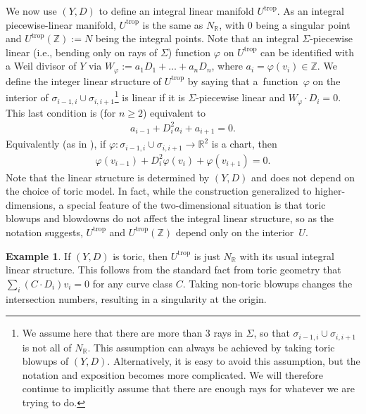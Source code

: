 \documentclass[11pt]{article}
\numberwithin{equation}{section}
\numberwithin{figure}{section}
\numberwithin{table}{section}
\DeclareMathOperator{\trop}{trop}
\let\bb=\mathbb
\let\rar=\rightarrow
\theoremstyle{definition}
\newtheorem{eg}[thm]{Example}
\begin{document}
We now use $(Y,D)$ to define an integral linear manifold $U^{\trop}$. As an integral piecewise-linear manifold, $U^{\trop}$ is the same as $N_{\bb{R}}$, with $0$ being a singular point and $U^{\trop}(\bb{Z}):=N$ being the integral points.
 Note that an integral $\Sigma$-piecewise linear (i.e., bending only on rays of $\Sigma$) function $\varphi$ on $U^{\trop}$ can be identified with a Weil divisor of $Y$ via $W_{\varphi}:=a_1D_1+\dots + a_n D_n$, where $a_i = \varphi(v_i)\in \bb{Z}$. We define the integer linear structure of $U^{\trop}$ by saying that a~func\-tion~$\varphi$ on the interior of $\sigma_{i-1,i}\cup\sigma_{i,i+1}$\footnote{We assume here that there are more than $3$ rays in $\Sigma$, so that $\sigma_{i-1,i}\cup \sigma_{i,i+1}$ is not all of $N_{\bb{R}}$. This assumption can always be achieved by taking toric blowups of $(Y,D)$. Alternatively, it is easy to avoid this assumption, but the notation and exposition becomes more complicated. We will therefore continue to implicitly assume that there are enough rays for whatever we are trying to do.} is linear if it is $\Sigma$-piecewise linear and $W_\varphi \cdot D_{i} = 0$. This last condition is (for $n\geq 2$) equivalent to
\begin{gather*}
	a_{i-1} +D_{i}^2 a_{i} + a_{i+1} = 0.
\end{gather*}
Equivalently (as in \cite{GHK1}), if $\varphi\colon \sigma_{i-1,i}\cup \sigma_{i,i+1}\rar \bb{R}^2$ is a chart, then
\begin{gather} \label{linear}
	\varphi(v_{i-1})+D_{i}^2 \varphi(v_i) + \varphi(v_{i+1}) = 0.
\end{gather}
Note that the linear structure is determined by $(Y,D)$ and does not depend on the choice of toric model. In fact, while the construction generalized to higher-dimensions, a special feature of the two-dimensional situation is that toric blowups and blowdowns do not affect the integral linear structure, so as the notation suggests, $U^{\trop}$ and $U^{\trop}(\bb{Z})$ depend only on the interior~$U$.

\begin{eg}
If $(Y,D)$ is toric, then $U^{\trop}$ is just $N_{\bb{R}}$ with its usual integral linear structure. This follows from the standard fact from toric geometry that
$
	\sum_i (C \cdot D_i) v_i = 0
$
for any curve class $C$. Taking non-toric blowups changes the intersection numbers, resulting in a singularity at the origin.
\end{eg}
\end{document}
